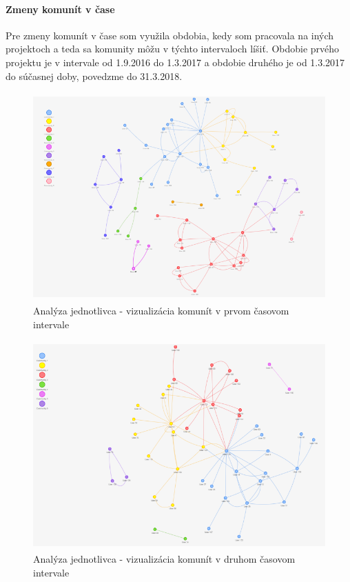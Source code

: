 \documentclass[slovak,master,public,dept460,male,cpdeclaration,oneside]{diploma}
\begin{document}
\paragraph{Zmeny komunít v čase}
\hfill \break
Pre zmeny komunít v čase som využila obdobia, kedy som pracovala na iných projektoch a teda sa komunity môžu v týchto intervaloch líšiť. Obdobie prvého projektu je v intervale od 1.9.2016 do 1.3.2017 a obdobie druhého je od 1.3.2017 do súčasnej doby, povedzme do 31.3.2018. 


\begin{figure}[H]
\centering
\includegraphics[width=12cm, height=8cm]{figures/analyza_jednotlivca_komunity_firstInt}
\caption{Analýza jednotlivca - vizualizácia komunít v prvom časovom intervale}
\label{analyza_jednotlivca_komunity_firstInt}
\end{figure}

\begin{figure}[H]
\centering
\includegraphics[width=12cm, height=8cm]{figures/analyza_jednotlivca_komunity_secondInt}
\caption{Analýza jednotlivca - vizualizácia komunít v druhom časovom intervale}
\label{analyza_jednotlivca_komunity_secondInt}
\end{figure}
\end{document}
